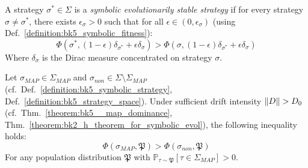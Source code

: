 \begin{definition}
\label{definition:bk5_symbolic_ess}
A strategy $\sigma^* \in \Sigma$ is a \emph{symbolic evolutionarily stable strategy} if for every strategy $\sigma \neq \sigma^*$, there exists $\epsilon_\sigma > 0$ such that for all $\epsilon \in (0, \epsilon_\sigma)$ (using Def.~\ref{definition:bk5_symbolic_fitness}):
\begin{equation}
\Phi(\sigma^*, (1-\epsilon)\delta_{\sigma^*} + \epsilon\delta_\sigma) > \Phi(\sigma, (1-\epsilon)\delta_{\sigma^*} + \epsilon\delta_\sigma)
\end{equation}
Where $\delta_\sigma$ is the Dirac measure concentrated on strategy $\sigma$.
\end{definition}
\begin{lemma}
\label{lemma:bk5_map_fitness_advantage}
Let $\sigma_{MAP} \in \Sigma_{MAP}$ and $\sigma_{non} \in \Sigma \setminus \Sigma_{MAP}$ (cf.~Def.~\ref{definition:bk5_symbolic_strategy}, Def.~\ref{definition:bk5_strategy_space}). Under sufficient drift intensity $\|D\| > D_0$ (cf.~Thm.~\ref{theorem:bk5__map_dominance}, Thm.~\ref{theorem:bk2_h_theorem_for_symbolic_evol}), the following inequality holds:
\begin{equation}
\Phi(\sigma_{MAP}, \mathfrak{P}) > \Phi(\sigma_{non}, \mathfrak{P})
\end{equation}
For any population distribution $\mathfrak{P}$ with $\mathbb{P}_{\tau \sim \mathfrak{P}}[\tau \in \Sigma_{MAP}] > 0$.
\end{lemma}
